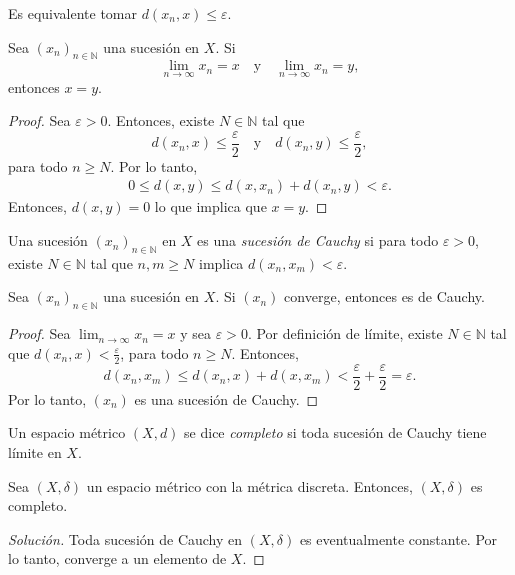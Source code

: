 \begin{remark}
    Es equivalente tomar $d(x_n, x) \leq \varepsilon$.
\end{remark}

\begin{proposition}
    Sea $(x_n)_{n \in \mathbb{N}}$ una sucesión en $X$. Si 
    $$
        \lim_{n \to \infty} x_n = x \quad\text{y}\quad \lim_{n \to \infty} x_n = y,
    $$
    entonces $x = y$.
\end{proposition}

\begin{proof}
    Sea $\varepsilon > 0$. Entonces, existe $N \in \mathbb{N}$ tal que 
    $$
        d(x_n, x) \leq \frac{\varepsilon}{2} \quad \text{y} \quad d(x_n, y) \leq \frac{\varepsilon}{2},
    $$
    para todo $n \geq N$. Por lo tanto,
    \begin{align*}
        0 \leq  d(x, y) \leq d(x, x_n) + d(x_n, y) < \varepsilon.
    \end{align*}
    Entonces, $d(x, y) = 0$ lo que implica que $x = y$.
\end{proof}

\begin{definition}
    Una sucesión $(x_n)_{n \in \mathbb{N}}$ en $X$ es una \emph{sucesión de Cauchy} si para todo $\varepsilon > 0$, existe $N \in \mathbb{N}$ tal que $n, m \geq N$ implica $d(x_n, x_m) < \varepsilon$.
\end{definition}

\begin{proposition}
    Sea $(x_n)_{n \in \mathbb{N}}$ una sucesión en $X$. Si $(x_n)$ converge, entonces es de Cauchy.
\end{proposition}

\begin{proof}
    Sea $\lim_{n \to \infty} x_n = x$ y sea $\varepsilon > 0$. Por definición de límite, existe $N \in \mathbb{N}$ tal que $d(x_n, x) < \frac{\varepsilon}{2}$, para todo $n \geq N$. Entonces,
    $$
        d(x_n, x_m) \leq d(x_n, x) + d(x, x_m) < \frac{\varepsilon}{2} + \frac{\varepsilon}{2} = \varepsilon.
    $$
    Por lo tanto, $(x_n)$ es una sucesión de Cauchy.
\end{proof}

\begin{definition}
    Un espacio métrico $(X, d)$ se dice \emph{completo} si toda sucesión de Cauchy tiene límite en $X$.   
\end{definition}

\begin{example}
    Sea $(X, \delta)$ un espacio métrico con la métrica discreta. Entonces, $(X, \delta)$ es completo.
\end{example}

\begin{proof}[Solución]
    Toda sucesión de Cauchy en $(X, \delta)$ es eventualmente constante. Por lo tanto, converge a un elemento de $X$.
\end{proof}